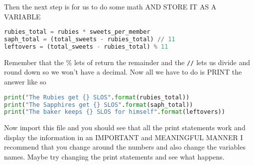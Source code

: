 \documentclass{article}
\begin{document}
Then the next step is for us to do some math AND STORE IT AS A VARIABLE
\begin{lstlisting}[language=Python]
rubies_total = rubies * sweets_per_member
saph_total = (total_sweets - rubies_total) // 11
leftovers = (total_sweets - rubies_total) % 11
\end{lstlisting}
Remember that the \% lets of return the remainder and the \verb|//| lets us divide and round 
down so we won't have a decimal. 
Now all we have to do is PRINT the answer like so 
\begin{lstlisting}[language=Python]
print("The Rubies get {} SLOS".format(rubies_total))
print("The Sapphires get {} SLOS".format(saph_total))
print("The baker keeps {} SLOS for himself".format(leftovers))
\end{lstlisting}

Now import this file and you should see that all the print statements work and display 
the information in an IMPORTANT and MEANINGFUL MANNER
I recommend that you change around the numbers and also change the variables names. 
Maybe try changing the print statements and see what happens.  
\end{document}
